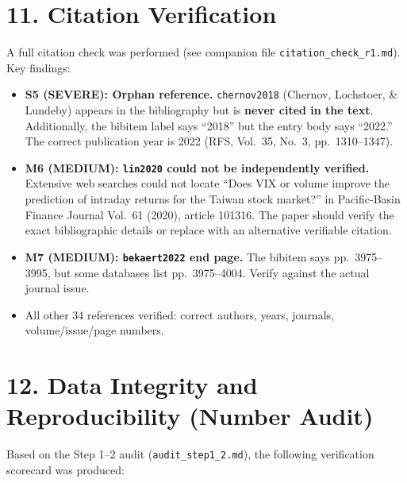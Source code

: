\documentclass[12pt,a4paper]{article}
\begin{document}
\section*{11. Citation Verification}

A full citation check was performed (see companion file \texttt{citation\_check\_r1.md}).  Key findings:

\begin{itemize}[nosep]
  \item \textcolor{errorred}{\textbf{S5 (SEVERE): Orphan reference.}}  \texttt{chernov2018} (Chernov, Lochstoer, \& Lundeby) appears in the bibliography but is \textbf{never cited in the text}.  Additionally, the bibitem label says ``2018'' but the entry body says ``2022.''  The correct publication year is 2022 (RFS, Vol.\ 35, No.\ 3, pp.\ 1310--1347).
  \item \textcolor{warncolor}{\textbf{M6 (MEDIUM): \texttt{lin2020} could not be independently verified.}}  Extensive web searches could not locate ``Does VIX or volume improve the prediction of intraday returns for the Taiwan stock market?'' in Pacific-Basin Finance Journal Vol.\ 61 (2020), article 101316.  The paper should verify the exact bibliographic details or replace with an alternative verifiable citation.
  \item \textcolor{warncolor}{\textbf{M7 (MEDIUM): \texttt{bekaert2022} end page.}}  The bibitem says pp.\ 3975--3995, but some databases list pp.\ 3975--4004.  Verify against the actual journal issue.
  \item All other 34 references verified: correct authors, years, journals, volume/issue/page numbers.
\end{itemize}

\section*{12. Data Integrity and Reproducibility (Number Audit)}

Based on the Step 1--2 audit (\texttt{audit\_step1\_2.md}), the following verification scorecard was produced:

\bigskip
\end{document}
